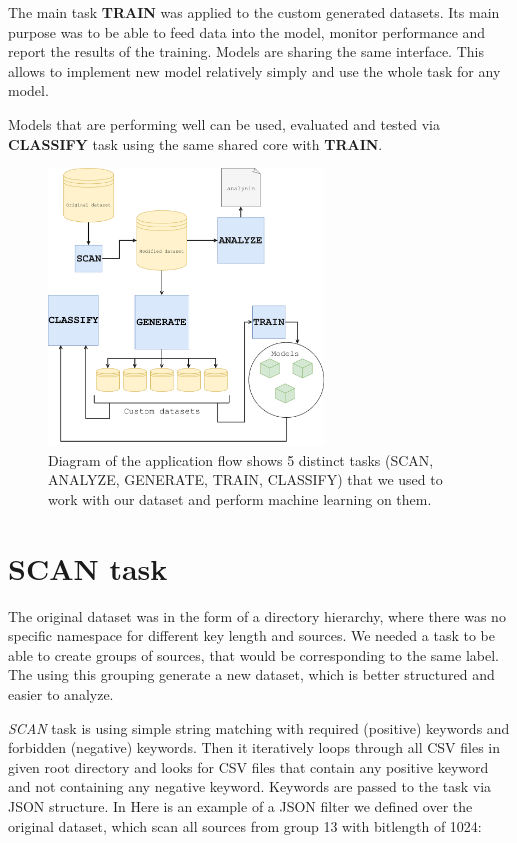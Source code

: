 The main task \textbf{TRAIN} was applied to the custom generated datasets. Its main purpose was to be able to feed data into the model, monitor performance and report the results of the training. Models are sharing the same interface. This allows to implement new model relatively simply and use the whole task for any model.

Models that are performing well can be used, evaluated and tested via \textbf{CLASSIFY} task using the same shared core with \textbf{TRAIN}.

\begin{figure}[H]

\centering
\label{figure-model}
\includegraphics[width=0.65\textwidth]{tex/images/thesis_model}
\caption{Diagram of the application flow shows 5 distinct tasks (SCAN, ANALYZE, GENERATE, TRAIN, CLASSIFY) that we used to work with our dataset and perform machine learning on them.}

\end{figure}

\section{SCAN task}

The original dataset was in the form of a directory hierarchy, where there was no specific namespace for different key length and sources. We needed a task to be able to create groups of sources, that would be corresponding to the same label. The using this grouping generate a new dataset, which is better structured and easier to analyze.

\textit{SCAN} task is using simple string matching with required (positive) keywords and forbidden (negative) keywords. Then it iteratively loops through all CSV files in given root directory and looks for CSV files that contain any positive keyword and not containing any negative keyword. Keywords are passed to the task via JSON structure. In Here is an example of a JSON filter we defined over the original dataset, which scan all sources from group 13 with bitlength of 1024: 

